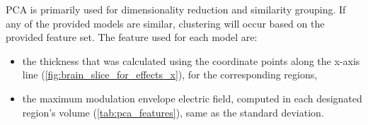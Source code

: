 \gls{PCA} is primarily used for dimensionality reduction and similarity grouping. If any of the provided models are similar, clustering will occur based on the provided feature set. The feature used for each model are:
\begin{itemize}
    \item the thickness that was calculated using the coordinate points along the x-axis line (\autoref{fig:brain_slice_for_effects_x}), for the corresponding regions,
    \item the maximum modulation envelope electric field, computed in each designated region's volume (\autoref{tab:pca_features}), same as the standard deviation.
\end{itemize}
